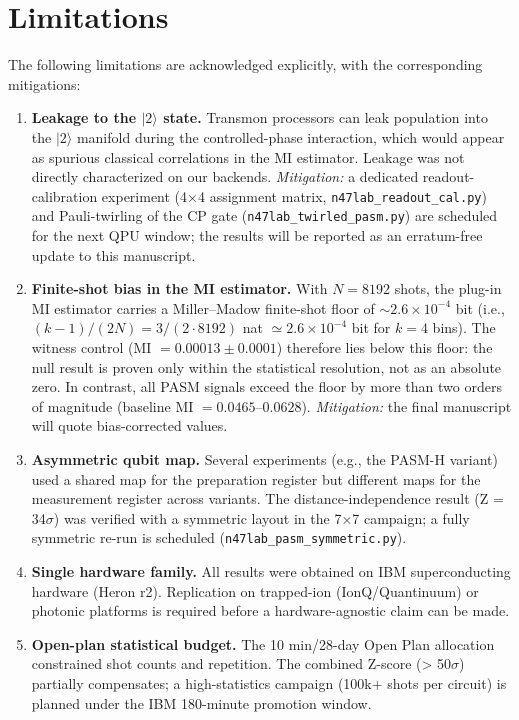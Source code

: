 ﻿\documentclass[12pt,a4paper]{article}
\begin{document}
\section*{Limitations}

The following limitations are acknowledged explicitly, with the corresponding mitigations:

\begin{enumerate}
    \item \textbf{Leakage to the $|2\rangle$ state.} Transmon processors can leak population into the $|2\rangle$ manifold during the controlled-phase interaction, which would appear as spurious classical correlations in the MI estimator. Leakage was not directly characterized on our backends. \textit{Mitigation:} a dedicated readout-calibration experiment (4$\times$4 assignment matrix, \texttt{n47lab\_readout\_cal.py}) and Pauli-twirling of the CP gate (\texttt{n47lab\_twirled\_pasm.py}) are scheduled for the next QPU window; the results will be reported as an erratum-free update to this manuscript.
    \item \textbf{Finite-shot bias in the MI estimator.} With $N=8192$ shots, the plug-in MI estimator carries a Miller--Madow finite-shot floor of $\sim 2.6\times10^{-4}$ bit (i.e., $(k-1)/(2N) = 3/(2\cdot 8192)$ nat $\simeq 2.6\times10^{-4}$ bit for $k=4$ bins). The witness control (MI $= 0.00013 \pm 0.0001$) therefore lies below this floor: the null result is proven only within the statistical resolution, not as an absolute zero. In contrast, all PASM signals exceed the floor by more than two orders of magnitude (baseline MI $= 0.0465$--$0.0628$). \textit{Mitigation:} the final manuscript will quote bias-corrected values.
    \item \textbf{Asymmetric qubit map.} Several experiments (e.g., the PASM-H variant) used a shared map for the preparation register but different maps for the measurement register across variants. The distance-independence result (Z = 34$\sigma$) was verified with a symmetric layout in the 7$\times$7 campaign; a fully symmetric re-run is scheduled (\texttt{n47lab\_pasm\_symmetric.py}).
    \item \textbf{Single hardware family.} All results were obtained on IBM superconducting hardware (Heron r2). Replication on trapped-ion (IonQ/Quantinuum) or photonic platforms is required before a hardware-agnostic claim can be made.
    \item \textbf{Open-plan statistical budget.} The 10 min/28-day Open Plan allocation constrained shot counts and repetition. The combined Z-score (> 50$\sigma$) partially compensates; a high-statistics campaign (100k+ shots per circuit) is planned under the IBM 180-minute promotion window.
\end{enumerate}
\end{document}
